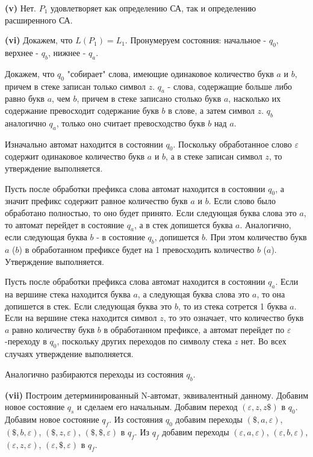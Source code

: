 \documentclass[10pt]{article}
\let \eps \varepsilon
\begin{document}
\smallskip

{\bf (v)}
Нет. $P_1$ удовлетворяет как определению СА, так и определению расширенного СА.

\smallskip

{\bf (vi)}
Докажем, что $L(P_1) = L_1$. Пронумеруем состояния: начальное - $q_0$, верхнее - $q_b$, нижнее - $q_a$.

Докажем, что $q_0$ "собирает" слова, имеющие одинаковое количество букв $a$ и $b$, причем в стеке записан только символ $z$. $q_a$ - слова, содержащие больше либо равно букв $a$, чем $b$, причем в стеке записано столько букв $a$, насколько их содержание превосходит содержание букв $b$ в слове, а затем символ $z$. $q_b$ аналогично $q_a$, только оно считает превосходство букв $b$ над $a$.

Изначально автомат находится в состоянии $q_0$. Поскольку обработанное слово $\eps$ содержит одинаковое количество букв $a$ и $b$, а в стеке записан символ $z$, то утверждение выполняется.

Пусть после обработки префикса слова автомат находится в состоянии $q_0$, а значит префикс содержит равное количество букв $a$ и $b$. Если слово было обработано полностью, то оно будет принято. Если следующая буква слова это $a$, то автомат перейдет в состояние $q_a$, а в стек допишется буква $a$. Аналогично, если следующая буква $b$ - в состояние $q_b$, допишется $b$. При этом количество букв $a$ ($b$) в обработанном префиксе будет на 1 превосходить количество $b$ ($a$). Утверждение выполняется.

Пусть после обработки префикса слова автомат находится в состоянии $q_a$. Если на вершине стека находится буква $a$, а следующая буква слова это $a$, то она допишется в стек. Если следующая буква это $b$, то из стека сотрется 1 буква $a$. Если на вершине стека находится символ $z$, то это означает, что количество букв $a$ равно количеству букв $b$ в обработанном префиксе, а автомат перейдет по $\eps$-переходу в $q_0$, поскольку других переходов по символу стека $z$ нет. Во всех случаях утверждение выполняется.

Аналогично разбираются переходы из состояния $q_b$.

\smallskip

{\bf (vii)}
Построим детерминированный N-автомат, эквивалентный данному. Добавим новое состояние $q_s$ и сделаем его начальным. Добавим переход $(\eps, z, z \$)$ в $q_0$. Добавим новое состояние $q_f$. Из состояния $q_0$ добавим переходы $(\$, a, \eps)$, $(\$, b, \eps)$, $(\$, z, \eps)$, $(\$, \$, \eps)$ в $q_f$. Из $q_f$ добавим переходы $(\eps, a, \eps)$, $(\eps, b, \eps)$, $(\eps, z, \eps)$, $(\eps, \$, \eps)$ в $q_f$.
\end{document}
